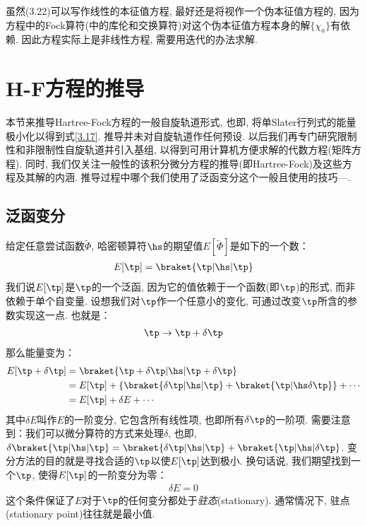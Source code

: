 虽然(3.22)可以写作线性的本征值方程, 最好还是将视作一个伪本征值方程的, 因为方程中的Fock算符(中的库伦和交换算符)对这个伪本征值方程本身的解$\{\chi_a \}$有依赖. 因此\hft 方程实际上是非线性方程, 需要用迭代的办法求解.
\section{H-F方程的推导}
本节来推导Hartree-Fock方程的一般自旋轨道形式, 也即, 将单Slater行列式的能量极小化以得到式\eqref{3.17}. 推导并未对自旋轨道作任何预设. 以后我们再专门研究限制性和非限制性自旋轨道并引入基组, 以得到可用计算机方便求解的代数方程(矩阵方程). 同时, 我们仅关注一般性的该积分微分方程的推导(即Hartree-Fock)及这些方程及其解的内涵. 推导过程中哪个我们使用了泛函变分这个一般且使用的技巧—.  
\subsection{泛函变分}
给定任意尝试函数$\tilde{\Phi}$, 哈密顿算符$\hs$的期望值$E[\tilde{\Phi}]$是如下的一个数：
\begin{align}
E[\tp] = \braket{\tp|\hs|\tp}
\end{align}
我们说$E[\tp]$是$\tp$的一个泛函, 因为它的值依赖于一个函数(即$\tp$)的形式, 而非依赖于单个自变量. 设想我们对$\tp$作一个任意小的变化, 可通过改变$\tp$所含的参数实现这一点. 也就是：
\begin{align}
\tp \to \tp + \delta\tp
\end{align} 
那么能量变为：
\begin{align}
E[\tp+\delta\tp] & = \braket{\tp+\delta\tp|\hs|\tp+\delta\tp} \notag\\
                 & = E[\tp] + \{ \braket{\delta\tp|\hs|\tp} + \braket{\tp|\hs\delta\tp} \} + \cdots \notag\\
                 & = E[\tp] + \delta E + \cdots
\end{align}
其中$\delta E$叫作$E$的一阶变分, 它包含所有线性项, 也即所有$\delta\tp$的一阶项. 需要注意到：我们可以微分算符的方式来处理$\delta$, 也即, $\delta\braket{\tp|\hs|\tp} = \braket{\delta\tp|\hs|\tp} + \braket{\tp|\hs|\delta\tp}$. 变分方法的目的就是寻找合适的$\tp$以使$E[\tp]$达到极小. 换句话说, 我们期望找到一个$\tp$, 使得$E[\tp]$的一阶变分为零：
\begin{align}
\delta E = 0
\end{align}
这个条件保证了$E$对于$\tp$的任何变分都处于\emph{驻态}(stationary). 通常情况下, 驻点(stationary point)往往就是最小值.

